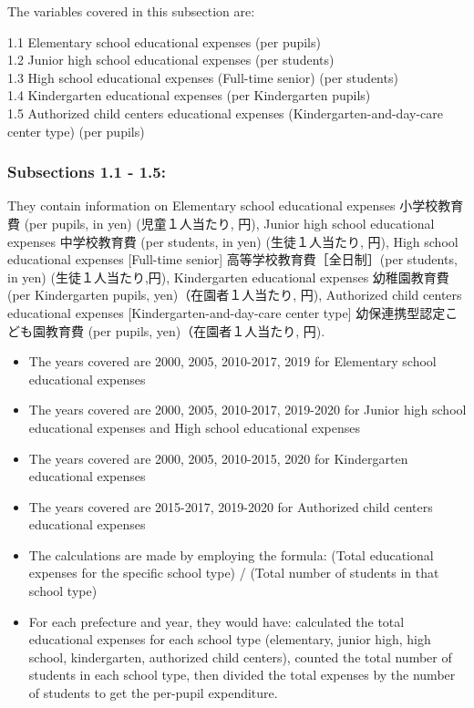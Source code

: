 \documentclass[
  12pt,
  letterpaper,
  DIV=11,
  numbers=noendperiod]{scrartcl}
\begin{document}
The variables covered in this subsection are:

1.1 Elementary school educational expenses (per pupils)\\
1.2 Junior high school educational expenses (per students)\\
1.3 High school educational expenses (Full-time senior) (per students)\\
1.4 Kindergarten educational expenses (per Kindergarten pupils)\\
1.5 Authorized child centers educational expenses
(Kindergarten-and-day-care center type) (per pupils)

\hypertarget{subsections-1.1---1.5-1}{%
\subsubsection{Subsections 1.1 - 1.5:}\label{subsections-1.1---1.5-1}}

They contain information on Elementary school educational expenses
小学校教育費 (per pupils, in yen) (児童１人当たり, 円), Junior high
school educational expenses 中学校教育費 (per students, in yen)
(生徒１人当たり, 円), High school educational expenses {[}Full-time
senior{]} 高等学校教育費［全日制］(per students, in yen)
(生徒１人当たり,円), Kindergarten educational expenses 幼稚園教育費 (per
Kindergarten pupils, yen)（在園者１人当たり, 円), Authorized child
centers educational expenses {[}Kindergarten-and-day-care center type{]}
幼保連携型認定こども園教育費 (per pupils, yen)（在園者１人当たり, 円).

\begin{itemize}
\item
  The years covered are 2000, 2005, 2010-2017, 2019 for Elementary
  school educational expenses
\item
  The years covered are 2000, 2005, 2010-2017, 2019-2020 for Junior high
  school educational expenses and High school educational expenses
\item
  The years covered are 2000, 2005, 2010-2015, 2020 for Kindergarten
  educational expenses
\item
  The years covered are 2015-2017, 2019-2020 for Authorized child
  centers educational expenses
\item
  The calculations are made by employing the formula: (Total educational
  expenses for the specific school type) / (Total number of students in
  that school type)
\item
  For each prefecture and year, they would have: calculated the total
  educational expenses for each school type (elementary, junior high,
  high school, kindergarten, authorized child centers), counted the
  total number of students in each school type, then divided the total
  expenses by the number of students to get the per-pupil expenditure.
\end{itemize}
\end{document}
